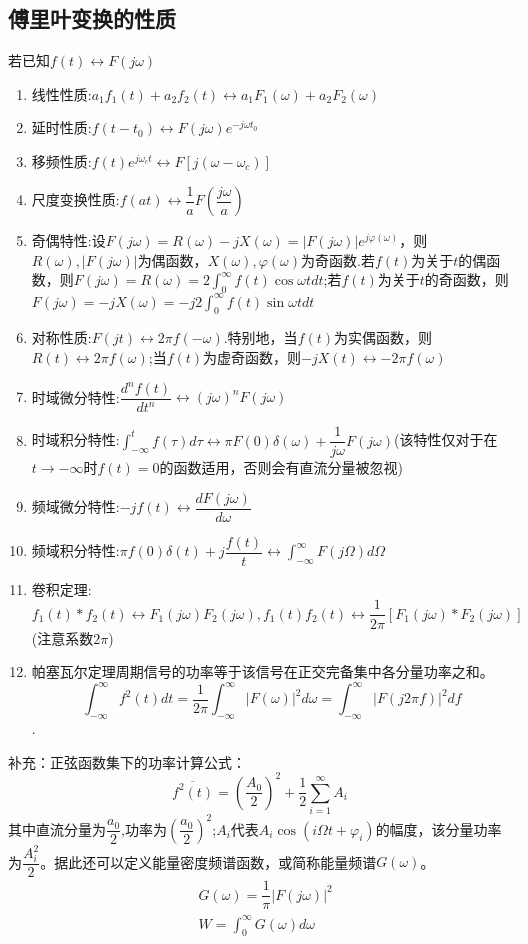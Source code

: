 \subsection{傅里叶变换的性质}
若已知$f(t)\leftrightarrow F(j\omega)$
\begin{enumerate}
    \item 线性性质:$a_1 f_1(t)+a_2 f_2(t) \leftrightarrow a_1 F_1(\omega)+a_2 F_2(\omega)$
    \item 延时性质:$f(t-t_0)\leftrightarrow F(j\omega)e^{-j\omega t_0}$
    \item 移频性质:$f(t)e^{j\omega_c t}\leftrightarrow F[j(\omega - \omega_c)]$
    \item 尺度变换性质:$f(at)\leftrightarrow \dfrac{1}{a}F(\dfrac{j\omega}{a})$
    \item 奇偶特性:设$F(j\omega)=R(\omega)-jX(\omega)=|F(j\omega)|e^{j \varphi(\omega)}$，则$R(\omega),|F(j\omega)|$为偶函数，$X(\omega),\varphi(\omega)$为奇函数.若$f(t)$为关于$t$的偶函数，则$F(j\omega)=R(\omega)=2\int_{0}^{\infty}f(t)\cos \omega t dt$;若$f(t)$为关于$t$的奇函数，则$F(j\omega)=-jX(\omega)=-j2\int_{0}^{\infty}f(t)\sin \omega t dt$
    \item 对称性质:$F(jt)\leftrightarrow 2 \pi f(-\omega)$.特别地，当$f(t)$为实偶函数，则$R(t)\leftrightarrow 2\pi f(\omega)$;当$f(t)$为虚奇函数，则$-jX(t)\leftrightarrow -2\pi f(\omega)$
    \item 时域微分特性:$\dfrac{d^n f(t)}{dt^n}\leftrightarrow (j\omega)^n F(j \omega)$
    \item 时域积分特性:$\int_{-\infty}^{t}f(\tau)d \tau \leftrightarrow \pi F(0)\delta(\omega)+\dfrac{1}{j\omega}F(j\omega)$(该特性仅对于在$t \to -\infty$时$f(t)=0$的函数适用，否则会有直流分量被忽视)
    \item 频域微分特性:$-jf(t)\leftrightarrow \dfrac{d F(j\omega)}{d\omega}$
    \item 频域积分特性:$\pi f(0)\delta(t)+j\dfrac{f(t)}{t}\leftrightarrow\int_{-\infty}^{\infty}F(j \Omega)d \Omega$
    \item 卷积定理:$f_1(t) * f_2(t)\leftrightarrow F_1(j\omega)F_2(j\omega),f_1(t)f_2(t)\leftrightarrow \dfrac{1}{2\pi}[F_1(j\omega)*F_2(j\omega)]$(注意系数$2\pi$)
    \item 帕塞瓦尔定理周期信号的功率等于该信号在正交完备集中各分量功率之和。$$\int_{-\infty}^{\infty}f^2(t)dt=\dfrac{1}{2\pi}\int_{-\infty}^{\infty}|F(\omega)|^2d\omega=\int_{-\infty}^{\infty}|F(j2\pi f)|^2df$$.
\end{enumerate}
补充：正弦函数集下的功率计算公式：
\begin{equation}
    \overline{f^2(t)}=(\dfrac{A_0}{2})^2 + \dfrac{1}{2}\sum_{i=1}^{\infty} A_i
\end{equation}
其中直流分量为$\dfrac{a_0}{2}$,功率为$(\dfrac{a_0}{2})^2$;$A_i$代表$A_i \cos (i\Omega t+\varphi_i)$的幅度，该分量功率为$\dfrac{A_i^2}{2}$。据此还可以定义能量密度频谱函数，或简称能量频谱$G(\omega)$。
\begin{align}
    &G(\omega)=\dfrac{1}{\pi}|F(j\omega)|^2\\
    &W=\int_{0}^{\infty}G(\omega)d\omega
\end{align}

